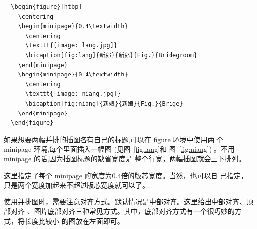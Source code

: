 \begin{lstlisting}
  \begin{figure}[htbp]
    \centering
    \begin{minipage}{0.4\textwidth}
      \centering
      \texttt{[image: lang.jpg]}
      \bicaption[fig:lang]{新郎}{新郎}{Fig.}{Bridegroom}
    \end{minipage}
    \begin{minipage}{0.4\textwidth}
      \centering
      \texttt{[image: niang.jpg]}
      \bicaption[fig:niang]{新娘}{新娘}{Fig.}{Brige}
    \end{minipage}
  \end{figure}
\end{lstlisting}

如果想要两幅并排的插图各有自己的标题,可以在 figure 环境中使用两
个 minipage 环境,每个里面插入一幅图 (见图~\ref{fig:lang}和
图~\ref{fig:niang}) 。不用 minipage 的话,因为插图标题的缺省宽度是
整个行宽，两幅插图就会上下排列。

这里指定了每个 minipage 的宽度为0.4倍的版芯宽度。当然，也可以自
己指定，只是两个宽度加起来不超过版芯宽度就可以了。

使用并排图时，需要注意对齐方式。默认情况是中部对齐。这里给出中部对齐、顶部对齐
、图片底部对齐三种常见方式。其中，底部对齐方式有一个很巧妙的方式，将长度比较小
的图放在左面即可。

